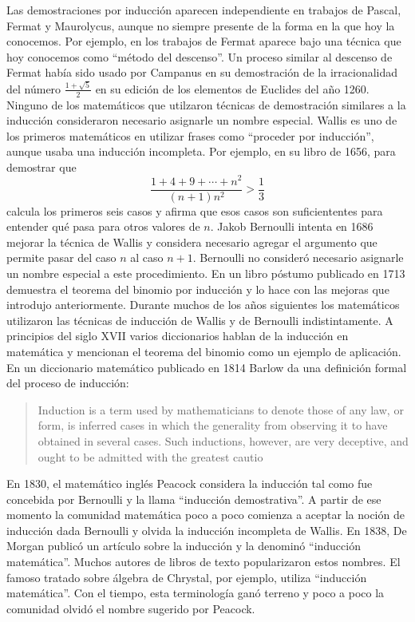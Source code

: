 Las demostraciones por inducción aparecen
independiente en trabajos de Pascal, Fermat y Maurolycus, aunque no siempre
presente de la forma en la que hoy la conocemos. Por ejemplo, en los trabajos
de Fermat aparece bajo una técnica que hoy conocemos como ``método del descenso''. 
Un proceso similar al descenso de Fermat había sido usado por Campanus en su
demostración de la irracionalidad del número $\frac{1+\sqrt{5}}{2}$ en su
edición de los elementos de Euclides del año 1260. Ninguno de los matemáticos
que utilzaron técnicas de demostración similares a la inducción consideraron
necesario asignarle un nombre especial. Wallis es uno de los primeros
matemáticos en utilizar frases como ``proceder por inducción'', aunque usaba
una inducción incompleta. Por ejemplo, en su libro de 1656, para demostrar que
\[
	\frac{1+4+9+\cdots+n^2}{(n+1)n^2}>\frac13
\]
calcula los primeros seis casos y afirma que esos casos son suficiententes para
entender qué pasa para otros valores de $n$. Jakob Bernoulli intenta en 1686
mejorar la técnica de Wallis y considera necesario agregar el argumento que
permite pasar del caso $n$ al caso $n+1$. Bernoulli no consideró necesario
asignarle un nombre especial a este procedimiento. En un libro póstumo
publicado en 1713 demuestra el teorema del binomio por inducción y lo hace con
las mejoras que introdujo anteriormente. Durante muchos de los años siguientes
los matemáticos utilizaron las técnicas de inducción de Wallis y de Bernoulli
indistintamente. A principios del siglo XVII varios diccionarios hablan de la
inducción en matemática y mencionan el teorema del binomio como un ejemplo de
aplicación.  En un diccionario matemático publicado en 1814 Barlow da una
definición formal del proceso de inducción:
\begin{quote}
	Induction is a term used by mathematicians to denote those of any law, or
	form, is inferred cases in which the generality from observing it to have
	obtained in several cases. Such inductions, however, are very deceptive,
	and ought to be admitted with the greatest cautio
\end{quote}
En 1830, el matemático inglés Peacock considera la inducción tal como fue
concebida por Bernoulli y la llama ``inducción demostrativa''. A partir de ese
momento la comunidad matemática poco a poco comienza a aceptar la noción de
inducción dada Bernoulli y olvida la inducción incompleta de Wallis.  En 1838,
De Morgan publicó un artículo sobre la inducción y la denominó ``inducción
matemática''. Muchos autores de libros de texto popularizaron estos nombres.
El famoso tratado sobre álgebra de Chrystal, por ejemplo, utiliza ``inducción
matemática''. Con el tiempo, esta terminología ganó terreno y poco a poco la
comunidad olvidó el nombre sugerido por Peacock. 


